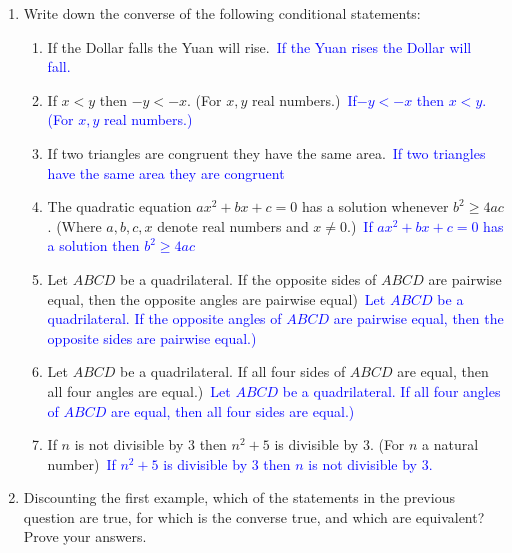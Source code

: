 \documentclass[13.5pt]{article}
\begin{document}
\begin{enumerate}
\item{Write down the converse of the following conditional statements:}

\begin{enumerate}
\setlength{\itemindent}{.1in}
\item{If the Dollar falls the Yuan will rise.}\
\textcolor{blue} {If the Yuan rises the Dollar will fall.}\
\item{If \(x<y\) then \(-y<-x\). (For \( x, y \) real numbers.)}\
\textcolor{blue} {If\(-y<-x\) then \(x<y\). (For \( x, y \) real numbers.)}\
\item{If two triangles are congruent they have the same area.}\
\textcolor{blue} {If two triangles have the same area they are congruent}\
\item{The quadratic equation \(ax^2+bx+c=0\) has a solution whenever \(b^2 \geq 4ac\). (Where \(a,b,c,x\) denote real numbers and \(x \neq 0\).)}\
\textcolor{blue} {If \(ax^2+bx+c=0\) has a solution then \(b^2 \geq 4ac\)}\
\item{Let \(ABCD\) be a quadrilateral. If the opposite sides of \(ABCD\) are pairwise equal, then the opposite angles are pairwise equal)}\
\textcolor{blue} {Let \(ABCD\) be a quadrilateral. If the opposite angles of \(ABCD\) are pairwise equal, then the opposite sides are pairwise equal.)}\
\item{Let \(ABCD\) be a quadrilateral. If all four sides of \(ABCD\) are equal, then all four angles are equal.)}\
\textcolor{blue} {Let \(ABCD\) be a quadrilateral. If all four angles of \(ABCD\) are equal, then all four sides are equal.)}\
\item{If \(n\) is not divisible by \(3\) then \(n^2+5\) is divisible by \(3\). (For \(n\) a natural number)}\
\textcolor{blue} {If \(n^2+5\) is divisible by \(3\) then \(n\) is not divisible by \(3\).}\
\end{enumerate}

\item{Discounting the first example, which of the statements in the previous question are true, for which is the converse true, and which are equivalent? Prove your answers.}


\end{enumerate}
\end{document}
